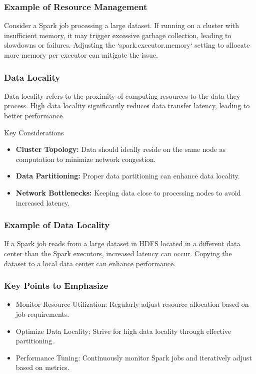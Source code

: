 \documentclass[aspectratio=169]{beamer}
\begin{document}
\begin{frame}[fragile]
  \frametitle{Example of Resource Management}
  Consider a Spark job processing a large dataset. If running on a cluster with insufficient memory, it may trigger excessive garbage collection, leading to slowdowns or failures. Adjusting the `spark.executor.memory` setting to allocate more memory per executor can mitigate the issue.
\end{frame}

\begin{frame}[fragile]
  \frametitle{Data Locality}
  Data locality refers to the proximity of computing resources to the data they process. High data locality significantly reduces data transfer latency, leading to better performance.
  
  \begin{block}{Key Considerations}
    \begin{itemize}
      \item \textbf{Cluster Topology:} Data should ideally reside on the same node as computation to minimize network congestion.
      \item \textbf{Data Partitioning:} Proper data partitioning can enhance data locality.
      \item \textbf{Network Bottlenecks:} Keeping data close to processing nodes to avoid increased latency.
    \end{itemize}
  \end{block}
\end{frame}

\begin{frame}[fragile]
  \frametitle{Example of Data Locality}
  If a Spark job reads from a large dataset in HDFS located in a different data center than the Spark executors, increased latency can occur. Copying the dataset to a local data center can enhance performance.
\end{frame}

\begin{frame}[fragile]
  \frametitle{Key Points to Emphasize}
  \begin{itemize}
    \item Monitor Resource Utilization: Regularly adjust resource allocation based on job requirements.
    \item Optimize Data Locality: Strive for high data locality through effective partitioning.
    \item Performance Tuning: Continuously monitor Spark jobs and iteratively adjust based on metrics.
  \end{itemize}
\end{frame}
\end{document}
